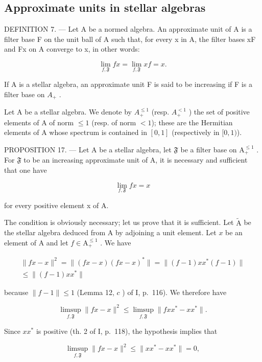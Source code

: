 \subsection{Approximate units in stellar algebras}

DEFINITION 7. --- Let A be a normed algebra. An approximate unit of A is a filter base F on the unit ball of A such that, for every x in A, the filter bases xF and Fx on A converge to x, in other words:

\[
\lim _ {f, \mathfrak {F}} f x = \lim _ {f, \mathfrak {F}} x f = x.
\]

If A is a stellar algebra, an approximate unit F is said to be increasing if F is a filter base on \(A_{+}\) .

Let A be a stellar algebra. We denote by \(A_{+}^{\leqslant1}\) (resp. \(A_{+}^{<1}\) ) the set of positive elements of A of norm \(\leqslant 1\) (resp. of norm \(< 1\)); these are the Hermitian elements of A whose spectrum is contained in \([0,1]\) (respectively in \([0,1)\)).

PROPOSITION 17. --- Let A be a stellar algebra, let \(\mathfrak{F}\) be a filter base on \(\mathrm{A}_{+}^{\leqslant 1}\) . For \(\mathfrak{F}\) to be an increasing approximate unit of A, it is necessary and sufficient that one have

\[
\lim _ {f, \mathfrak {F}} f x = x
\]

for every positive element x of A.

The condition is obviously necessary; let us prove that it is sufficient. Let \(\widetilde{\mathrm{A}}\) be the stellar algebra deduced from A by adjoining a unit element. Let \(x\) be an element of A and let \(f \in \mathrm{A}_{+}^{\leqslant 1}\) . We have

\[
\begin{array}{c} \| f x - x \| ^ {2} = \| (f x - x) (f x - x) ^ {*} \| = \| (f - 1) x x ^ {*} (f - 1) \| \\ \leqslant \| (f - 1) x x ^ {*} \| \end{array}
\]

because \(\| f - 1\| \leqslant 1\) (Lemma 12, \(c\) ) of I, p.~116). We therefore have

\[
\limsup _ {f, \mathfrak {F}} \| f x - x \| ^ {2} \leqslant \limsup _ {f, \mathfrak {F}} \| f x x ^ {*} - x x ^ {*} \|.
\]

Since \(xx^{*}\) is positive (th. 2 of I, p.~118), the hypothesis implies that

\[
\limsup _ {f, \mathfrak {F}} \| f x - x \| ^ {2} \leqslant \| x x ^ {*} - x x ^ {*} \| = 0,
\]

